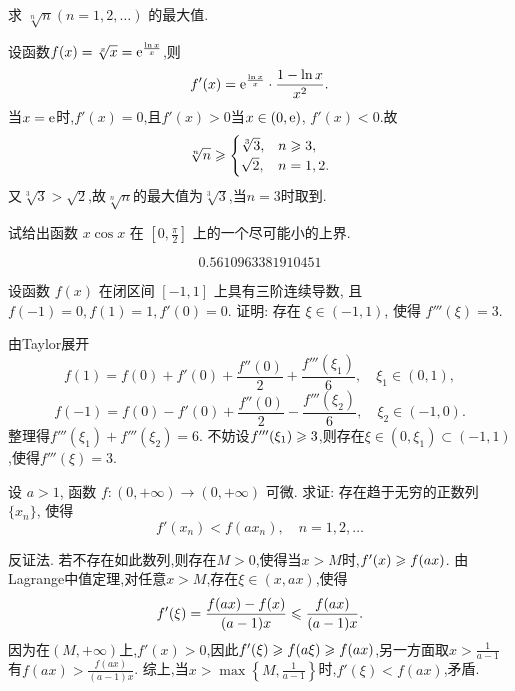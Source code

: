 \begin{exercise}[3.C.16]
    求 $\sqrt[n]{n} (n=1, 2, \dots)$ 的最大值.
\end{exercise}

\begin{solution}
    设函数$f(x) = \sqrt[x]{x} = \mathrm{e}^{\frac{\ln x}{x}}$,则
    $$f'(x) = \mathrm{e}^{\frac{\ln x}{x}} \cdot \frac{1 - \ln x}{x^2}.$$
    当$x = \mathrm{e}$时,$f'(x) = 0$,且$f'(x) > 0$当$x \in (0, \mathrm{e})$, $f'(x) < 0$.故
    $$\sqrt[n]{n} \geqslant  \begin{cases}
        \sqrt[3]{3}, & n \geqslant 3, \\
        \sqrt{2}, & n = 1, 2.
    \end{cases}$$
    又$\sqrt[3]{3} > \sqrt{2}$,故$\sqrt[n]{n}$的最大值为$\sqrt[3]{3}$,当$n = 3$时取到.
\end{solution}

\begin{exercise}[3.C.17]
    试给出函数 $x \cos x$ 在 $\left[0, \frac{\pi}{2}\right]$ 上的一个尽可能小的上界.
\end{exercise}

\begin{solution}
    $$0.5610963381910451$$
\end{solution}

\begin{exercise}[3.C.18]
    设函数 $f(x)$ 在闭区间 $[-1, 1]$ 上具有三阶连续导数, 且 $f(-1) = 0, f(1) = 1, f'(0) = 0$. 证明: 存在 $\xi \in (-1, 1)$, 使得 $f'''(\xi) = 3$.
\end{exercise}

\begin{solution}
    由Taylor展开
    $$f(1) = f(0) + f'(0) + \frac{f''(0)}{2} + \frac{f'''(\xi_1)}{6}, \quad \xi_1 \in (0, 1),$$
    $$f(-1) = f(0) - f'(0) + \frac{f''(0)}{2} - \frac{f'''(\xi_2)}{6}, \quad \xi_2 \in (-1, 0).$$
    整理得$f'''(\xi_1) + f'''(\xi_2) = 6$. 不妨设$f'''(\xi_1) \geqslant 3$,则存在$\xi \in (0, \xi_1) \subset (-1, 1)$,使得$f'''(\xi) = 3$.
\end{solution}

\begin{exercise}[3.C.19]
    设 $a > 1$, 函数 $f: (0, +\infty) \to (0, +\infty)$ 可微. 求证: 存在趋于无穷的正数列 $\{x_n\}$, 使得
    $$f'(x_n) < f(a x_n), \quad n=1, 2, \dots$$
\end{exercise}

\begin{solution}
    反证法. 若不存在如此数列,则存在$M > 0$,使得当$x > M$时,$f'(x) \geqslant f(a x)$. 由Lagrange中值定理,对任意$x > M$,存在$\xi \in (x, a x)$,使得
    $$f'( \xi) = \frac{f(a x) - f(x)}{(a - 1) x} \leqslant \frac{f(a x)}{(a - 1) x}.$$
    因为在$(M, +\infty)$上,$f'(x)>0$,因此$f'(\xi) \geqslant f(a \xi) \geqslant f(ax)$,另一方面取$x > \frac{1}{a-1}$有$f(ax) > \frac{f(ax)}{(a-1)x}$. 综上,当$x > \max\left\{M, \frac{1}{a-1}\right\}$时,$f'( \xi) < f(a x)$,矛盾.
\end{solution}

